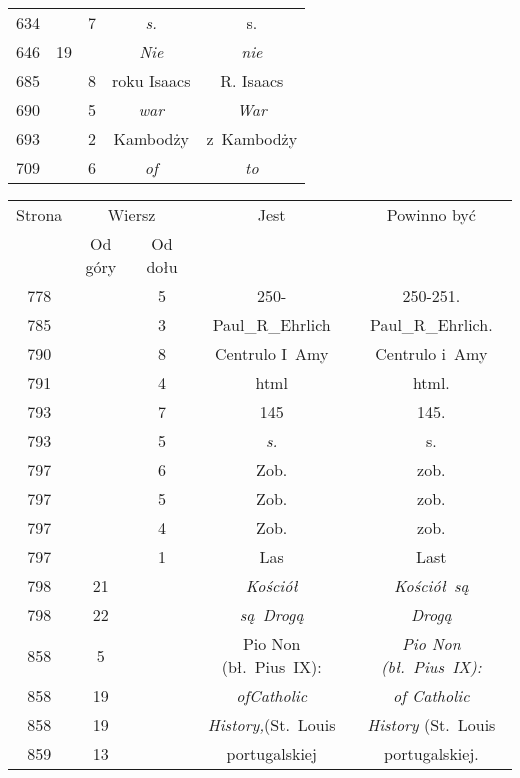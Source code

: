 \documentclass[a4paper,11pt]{article}
\begin{document}
\begin{center}
\begin{tabular}{|c|c|c|c|c|}
    634 & & \hphantom{0}7 & \textit{s.} & s. \\
    646 & 19 & & \textit{Nie} & \textit{nie} \\
    685 & & \hphantom{0}8 & roku Isaacs & R. Isaacs \\
    690 & & \hphantom{0}5 & \textit{war} & \textit{War} \\
    693 & & \hphantom{0}2 & Kambodży & z~Kambodży \\
    709 & & \hphantom{0}6 & \textit{of} & \textit{to} \\
    \hline
  \end{tabular}





  \newpage

  \begin{tabular}{|c|c|c|c|c|}
    \hline
    Strona & \multicolumn{2}{c|}{Wiersz} & Jest
                              & Powinno być \\ \cline{2-3}
    & Od góry & Od dołu & & \\
    \hline
    778 & & \hphantom{0}5 & 250- & 250-251. \\
    785 & & \hphantom{0}3 & Paul\_R\_Ehrlich & Paul\_R\_Ehrlich. \\
    790 & & \hphantom{0}8 & Centrulo I~Amy & Centrulo i~Amy \\
    791 & & \hphantom{0}4 & html & html. \\
    793 & & \hphantom{0}7 & 145 & 145. \\
    793 & & \hphantom{0}5 & \textit{s.} & s. \\
    797 & & \hphantom{0}6 & Zob. & zob. \\
    797 & & \hphantom{0}5 & Zob. & zob. \\
    797 & & \hphantom{0}4 & Zob. & zob. \\
    797 & & \hphantom{0}1 & Las & Last \\
    798 & 21 & & \textit{Kościół} & \textit{Kościół~są} \\
    798 & 22 & & \textit{są~Drogą} & \textit{Drogą} \\
    858 & \hphantom{0}5 & & Pio Non (bł.~Pius~IX):
           & \textit{Pio Non (bł.~Pius~IX):} \\
    858 & 19 & & \textit{ofCatholic} & \textit{of Catholic} \\
    858 & 19 & & \textit{History,}(St.~Louis
           & \textit{History} (St.~Louis \\
    859 & 13 & & portugalskiej & portugalskiej. \\

\end{tabular}
\end{center}
\end{document}
